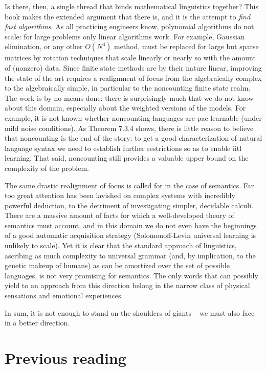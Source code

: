 Is there, then, a single thread that binds mathematical linguistics together?
This book makes the extended argument that there is, and it is the attempt to
{\it find fast algorithms.}  As all practicing engineers know, polynomial
algorithms do not scale: for large problems only linear algorithms work.  For
example, Gaussian elimination, or any other $O(N^3)$ method, must be replaced
for large but sparse matrices by rotation techniques that scale linearly or
nearly so with the amount of (nonzero) data. Since finite state methods are by
their nature linear, improving the state of the art requires a realignment of
focus from the algebraically complex to the algebraically simple, in
particular to the noncounting finite state realm. The work is by no means
done: there is surprisingly much that we do not know about this domain,
especially about the weighted versions of the models. For example, it is not
known whether noncounting languages are pac learnable (under mild noise
conditions).  As Theorem 7.3.4 shows, there is little reason to believe that
noncounting is the end of the story: to get a good characterization of
natural language syntax we need to establish further restrictions so as to
enable iitl learning. That said, noncounting still provides a valuable upper
bound on the complexity of the problem.

The same drastic realignment of focus is called for in the case of semantics.
Far too great attention has been lavished on complex systems with incredibly
powerful deduction, to the detriment of investigating simpler, decidable
calculi. There are a massive amount of facts for which a well-developed theory
of semantics must account, and in this domain we do not even have the
beginnings of a good automatic acquisition strategy (Solomonoff-Levin
universal learning is unlikely to scale).  Yet it is clear that the standard
approach of linguistics, ascribing as much complexity to universal grammar
(and, by implication, to the genetic makeup of humans) as can be amortized over
the set of possible languages, is not very promising for semantics. The only
words that can possibly yield to an approach from this direction belong in the
narrow class of physical sensations and emotional experiences.

In sum, it is not enough to stand on the shoulders of giants -- we must also
face in a better direction.

\section{Previous reading}

